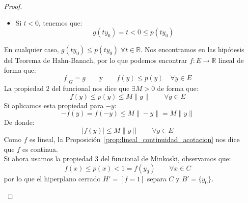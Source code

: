 \begin{teo}
\begin{proof}
\begin{description}
\begin{itemize}
                    \item Si $t<0$, tenemos que:
                        \begin{equation*}
                            g(ty_0) = t < 0 \leq p(ty_0)
                        \end{equation*}
                \end{itemize}
                En cualquier caso, $g(ty_0) \leq p(ty_0)$ $\forall t\in \mathbb{R}$. Nos encontramos en las hipótesis del Teorema de Hahn-Banach, por lo que podemos encontrar $f:E\to \mathbb{R}$ lineal de forma que:
                \begin{equation*}
                    f\big|_G = g \qquad \text{y}\qquad f(y)\leq p(y)\quad \forall y\in E
                \end{equation*}
                La propiedad 2 del funcional nos dice que $\exists M>0$ de forma que:
                \begin{equation*}
                    f(y) \leq p(y) \leq M\|y\| \qquad \forall y\in E
                \end{equation*}
                Si aplicamos esta propiedad para $-y$:
                \begin{equation*}
                    -f(y) = f(-y) \leq M\| -y\| = M\|y\|
                \end{equation*}
                De donde:
                \begin{equation*}
                    |f(y)| \leq M\|y\| \qquad \forall y\in E
                \end{equation*}
                Como $f$ es lineal, la Proposición~\ref{prop:lineal_continuidad_acotacion} nos dice que $f$ es continua.\\

                \noindent
                Si ahora usamos la propiedad 3 del funcional de Minkoski, observamos que:
                \begin{equation*}
                    f(x) \leq p(x) < 1 = f(y_0) \qquad \forall x\in C
                \end{equation*}
                por lo que el hiperplano cerrado $H'=[f=1]$ separa $C$ y $B'=\{y_0\}$.\\


\end{description}
\end{proof}
\end{teo}
